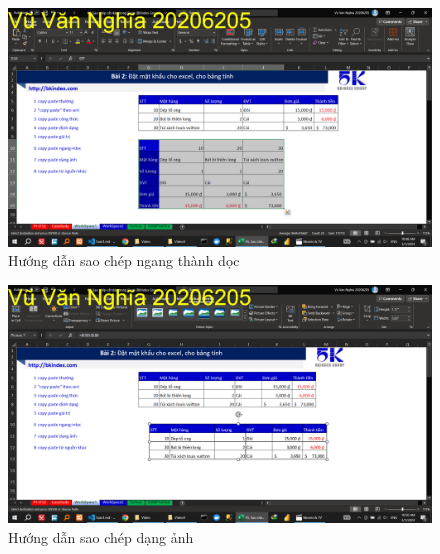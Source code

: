 \documentclass{article}
\begin{document}
\begin{figure}[H]
\centering
\includegraphics[scale = 0.15]{Video4/HuongDan/4.png}
\caption{Hướng dẫn sao chép ngang thành dọc}
\end{figure}

\begin{figure}[H]
\centering
\includegraphics[scale = 0.15]{Video4/HuongDan/5.png}
\caption{Hướng dẫn sao chép dạng ảnh}
\end{figure}
\end{document}
